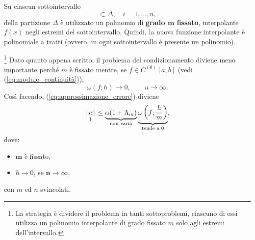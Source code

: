 \begin{property}\label{prop:sottointervalli_partizione}
	Su ciascun sottointervallo
	\begin{equation*}
		[x_{i-1}, x_i]\subset \Delta,\quad i=1,\hdots, n,
	\end{equation*}
	della partizione $\Delta$ è utilizzato un polinomio di \textbf{grado $\boldsymbol m$ fissato}, interpolante $f(x)$ negli estremi del sottointervallo. Quindi, la nuova funzione interpolante è polinomiale a tratti (ovvero, in ogni sottointervallo è presente un polinomio).
\end{property}

\footnote{La strategia è dividere il problema in tanti sottoproblemi, ciascuno di essi utilizza un polinomio interpolante di grado fissato $m$ solo agli estremi dell'intervallo.} Dato quanto appena scritto, il problema del condizionamento diviene meno importante perché $m$ è fissato mentre, se $f\in C^{(0)}[a,b]$ (vedi (\ref{eq:modulo_continuità})), 
\begin{equation*}
	\omega(f; h)\rightarrow 0,\quad\quad n\rightarrow \infty.
\end{equation*}
Così facendo, (\ref{eq:approssimazione_errore}) diviene
\begin{equation*}
    \underset{\footnotemark}{||e||}\leq\underbrace{\alpha (1+\Lambda_m)}_{\text{non varia}}\underbrace{\omega\left(f;\frac{h}{m}\right)}_{\text{tende a 0}},
\end{equation*}
dove:
\begin{itemize}
    \item $\boldsymbol{m}$ è fissato,
    \item $h\rightarrow 0$, se $\boldsymbol{n}\rightarrow\infty$,
\end{itemize}
con $m$ ed $n$ svincolati.

